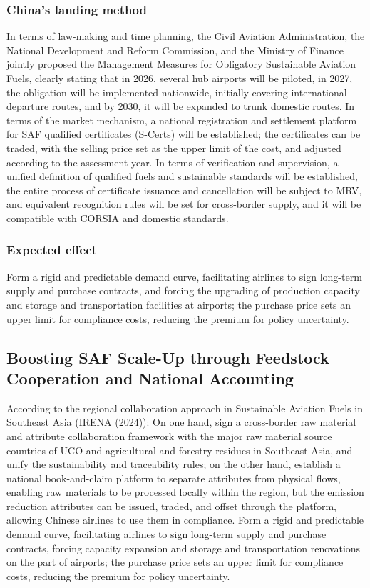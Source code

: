 \documentclass[a4paper,11pt]{article}
\begin{document}
\subsubsection{China's landing method}
In terms of law-making and time planning, the Civil Aviation Administration, the National Development and Reform Commission, and the Ministry of Finance jointly proposed the Management Measures for Obligatory Sustainable Aviation Fuels, clearly stating that in 2026, several hub airports will be piloted, in 2027, the obligation will be implemented nationwide, initially covering international departure routes, and by 2030, it will be expanded to trunk domestic routes. In terms of the market mechanism, a national registration and settlement platform for SAF qualified certificates (S-Certs) will be established; the certificates can be traded, with the selling price set as the upper limit of the cost, and adjusted according to the assessment year. In terms of verification and supervision, a unified definition of qualified fuels and sustainable standards will be established, the entire process of certificate issuance and cancellation will be subject to MRV, and equivalent recognition rules will be set for cross-border supply, and it will be compatible with CORSIA and domestic standards.

\subsubsection{Expected effect}
Form a rigid and predictable demand curve, facilitating airlines to sign long-term supply and purchase contracts, and forcing the upgrading of production capacity and storage and transportation facilities at airports; the purchase price sets an upper limit for compliance costs, reducing the premium for policy uncertainty.

\subsection{Boosting SAF Scale-Up through Feedstock Cooperation and National Accounting}
According to the regional collaboration approach in Sustainable Aviation Fuels in Southeast Asia (IRENA (2024)): On one hand, sign a cross-border raw material and attribute collaboration framework with the major raw material source countries of UCO and agricultural and forestry residues in Southeast Asia, and unify the sustainability and traceability rules; on the other hand, establish a national book-and-claim platform to separate attributes from physical flows, enabling raw materials to be processed locally within the region, but the emission reduction attributes can be issued, traded, and offset through the platform, allowing Chinese airlines to use them in compliance. Form a rigid and predictable demand curve, facilitating airlines to sign long-term supply and purchase contracts, forcing capacity expansion and storage and transportation renovations on the part of airports; the purchase price sets an upper limit for compliance costs, reducing the premium for policy uncertainty.
\end{document}

